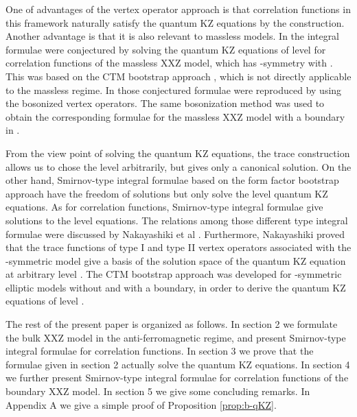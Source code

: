 \documentclass[a4paper,10pt]{article}
\begin{document}
One of advantages of the vertex operator approach is 
that correlation functions in this framework naturally 
satisfy the quantum KZ equations by the 
construction. Another advantage is that it is 
also relevant to massless models. 
In \cite{massless-XXZ} the integral formulae were 
conjectured by solving the quantum KZ equations of level 
\coordHE{} for correlation functions of the massless XXZ 
model, which has \coordHE{}-symmetry 
with \coordHE{}. This was based on the CTM bootstrap approach 
\cite{ESM}, which is not directly applicable to the massless 
regime. In \cite{JKM} those conjectured formulae 
were reproduced by using the bosonized vertex operators. 
The same bosonization method was used to 
obtain the corresponding formulae for the massless XXZ model 
with a boundary in \cite{b-massless-XXZ}. 

From the view point of solving the quantum KZ equations, 
the trace construction allows us to chose the level 
arbitrarily, but gives only a canonical solution. 
On the other hand, Smirnov-type integral 
formulae based on the form factor bootstrap approach have 
the freedom of solutions but only solve the level \coordHE{} quantum 
KZ equations. As for correlation functions, Smirnov-type 
integral formulae give solutions to the level \coordHE{} equations. 
The relations among those different type integral formulae 
were discussed by Nakayashiki et al \cite{NPT}. Furthermore, 
Nakayashiki proved that the trace functions of type I and 
type II vertex operators associated with the 
\coordHE{}-symmetric model 
give a basis of the solution space of the quantum KZ equation 
at arbitrary level \cite{N1}. The CTM bootstrap approach 
was developed for \coordHE{}-symmetric elliptic models 
without and with a boundary, in order to derive the quantum 
KZ equations of level \coordHE{} \cite{SPn,bBela,bJMO}. 

The rest of the present paper is organized as follows. 
In section 2 we formulate the bulk XXZ model in the 
anti-ferromagnetic regime, and present Smirnov-type integral 
formulae for correlation functions. In section 3 we prove 
that the formulae given in section 2 actually solve the quantum 
KZ equations. In section 4 we further present Smirnov-type 
integral formulae for correlation functions of the boundary 
XXZ model. In section 5 we give some concluding remarks. 
In Appendix A we give a simple proof of Proposition 
\ref{prop:b-qKZ}. 
\end{document}
